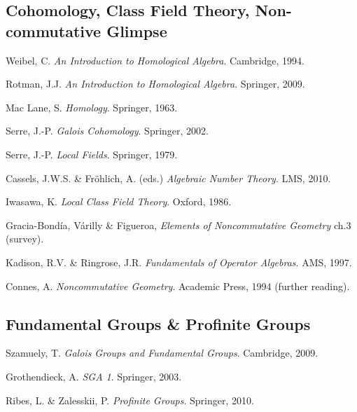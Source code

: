 \documentclass[11pt,a4paper]{article}
\begin{document}
	\subsection*{Cohomology, Class Field Theory, Non-commutative Glimpse}
	\begin{enumerate}[label={[\arabic*]},resume]
		\item Weibel, C. \emph{An Introduction to Homological Algebra}. Cambridge, 1994.
		\item Rotman, J.J. \emph{An Introduction to Homological Algebra}. Springer, 2009.
		\item Mac Lane, S. \emph{Homology}. Springer, 1963.
		\item Serre, J.-P. \emph{Galois Cohomology}. Springer, 2002.
		\item Serre, J.-P. \emph{Local Fields}. Springer, 1979.
		\item Cassels, J.W.S. \& Fr\"ohlich, A. (eds.) \emph{Algebraic Number Theory}. LMS, 2010.
		\item Iwasawa, K. \emph{Local Class Field Theory}. Oxford, 1986.
		\item Gracia-Bond\'ia, V\'arilly \& Figueroa, \emph{Elements of Noncommutative Geometry} ch.3 (survey).
		\item Kadison, R.V. \& Ringrose, J.R. \emph{Fundamentals of Operator Algebras}. AMS, 1997.
		\item Connes, A. \emph{Noncommutative Geometry}. Academic Press, 1994 (further reading).
	\end{enumerate}
	\subsection*{Fundamental Groups \& Profinite Groups}
	\begin{enumerate}[label={[\arabic*]},resume]
		\item Szamuely, T. \emph{Galois Groups and Fundamental Groups}. Cambridge, 2009.
		\item Grothendieck, A. \emph{SGA 1}. Springer, 2003.
		\item Ribes, L. \& Zalesskii, P. \emph{Profinite Groups}. Springer, 2010.
	\end{enumerate}
\end{document}
